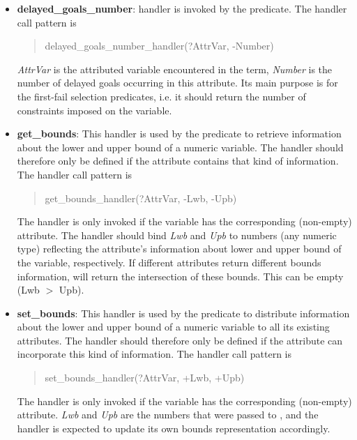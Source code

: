 \begin{itemize}
\item {\bf delayed_goals_number}: handler is invoked by the
predicate.
The handler call pattern is
\begin{quote}
delayed_goals_number_handler(?AttrVar, -Number)
\end{quote}
{\it AttrVar} is the attributed variable encountered in the
term, {\it Number} is the number of delayed
goals occurring in this attribute.
Its main purpose is for the first-fail selection predicates,
i.e. it should return the number of constraints imposed on
the variable.

\item {\bf get_bounds}:
    This handler is used by the predicate
    to retrieve information about the lower and upper bound of a numeric
    variable. 
    The handler should therefore only be defined if the attribute contains
    that kind of information. The handler call pattern is
    \begin{quote}
    get_bounds_handler(?AttrVar, -Lwb, -Upb)
    \end{quote}
    The handler is only invoked if the variable has the corresponding
    (non-empty) attribute.
    The handler should bind {\it Lwb} and {\it Upb} to numbers
    (any numeric type) reflecting the attribute's information about lower
    and upper bound of the variable, respectively.
    If different attributes return different bounds information,
    will return the intersection of these bounds. This can be empty (Lwb $>$ Upb).
 
\item {\bf set_bounds}:
    This handler is used by the predicate
    to distribute information about the lower and upper bound of a numeric
    variable to all its existing attributes. 
    The handler should therefore only be defined if the attribute can
    incorporate this kind of information. The handler call pattern is
    \begin{quote}
    set_bounds_handler(?AttrVar, +Lwb, +Upb)
    \end{quote}
    The handler is only invoked if the variable has the corresponding
    (non-empty) attribute.
    {\it Lwb} and {\it Upb} are the numbers that were passed to
    , and the handler is expected to update its
    own bounds representation accordingly.




\end{itemize}
